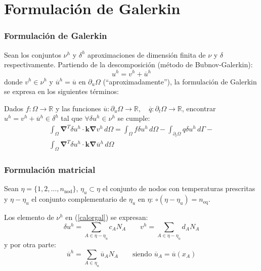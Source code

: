 \documentclass[handout]{beamer}
\begin{document}
\section{Formulación de Galerkin}
\begin{frame}
\frametitle{Formulación de Galerkin}
Sean los conjuntos $\nu^h$ y $\delta^h$ aproximaciones de
dimensión finita de $\nu$ y $\delta$ respectivamente. Partiendo de
la descomposición (método de Bubnov-Galerkin):
\begin{equation}
u^h=v^h+\overline{u}^h
\end{equation}
donde $v^h \in \nu^h$ y $\overline{u}^h=\overline{u}$ en $\partial_u \Omega$
(``aproximadamente''), la formulación de Galerkin se expresa en los
siguientes términos:

Dados $f:\Omega \rightarrow \mathbb{R}$ y las funciones
$\overline{u} :\partial_u \Omega \rightarrow \mathbb{R}, \quad
\overline{q} :\partial_t \Omega \rightarrow \mathbb{R}$, encontrar
$u^h=v^h+\overline{u}^h \in \delta^h$ tal que
$\forall \delta u^h \in \nu^h$ se cumple:
\begin{multline}
\int_{\Omega}
\bm{\nabla}^T \delta u^h \cdot \bm{k} \bm{\nabla} v^h \, d \Omega=
\int_{\Omega}
f \delta u^h \, d \Omega -
\int_{\partial_t \Omega} q \delta u^h \, d \Gamma- \\
\int_{\Omega}
\bm{\nabla}^T \delta u^h \cdot \bm{k} \bm{\nabla} \overline{u}^h \, d \Omega
\label{calorgal}
\end{multline}
\end{frame}
\begin{frame}
\frametitle{Formulación matricial}

Sean $\eta=\{ 1,2,\ldots,n_{\textrm{nod}} \}$,
$\eta_u \subset \eta$ el conjunto de nodos con temperaturas prescritas
y $\eta-\eta_u$ el conjunto complementario de $\eta_u$ en $\eta$:
$\circ(\eta-\eta_u)=n_{\textrm{eq}}$.

Los elemento de $\nu^h$ en (\ref{calorgal}) se expresan:
\begin{equation}
\delta u^h=\sum_{A \in \eta-\eta_u} c_A N_A \qquad
v^h=\sum_{A \in \eta-\eta_u} d_A N_A \label{termnuh}
\end{equation}
y por otra parte:
\begin{equation}
\overline{u}^h=\sum_{A \in \eta_u} \overline{u}_A N_A
\qquad \textrm{siendo } \overline{u}_A=\overline{u}(x_A) \label{termuh}
\end{equation}
\end{frame}
\end{document}
